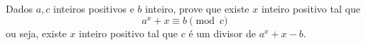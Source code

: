 Dados $a, c$ inteiros positivos e $b$ inteiro, prove que existe $x$ inteiro positivo tal que
$$a^x + x \equiv b \pmod{c}$$
ou seja, existe $x$ inteiro positivo tal que $c$ é um divisor de $a^x + x - b$.